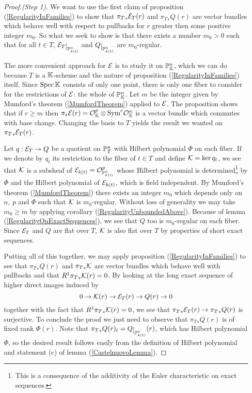 \begin{proof}[Proof.(Step 1)]
We want to use the first claim of proposition (\ref{RegularityInFamilies}) to show that ${\pi_T}_\ast\mathcal{E}_T(r)$ and ${\pi_T}_\ast Q(r)$ are vector bundles which behave well with respect to pullbacks for $r$ greater then some positive integer $m_0$. So what we seek to show is that there exists a number $m_0>0$ such that for all $t\in T$, $\Ec_T\res{\Pj^n_{k(t)}}$ and $Q\res{\Pj^n_{k(t)}}$ are $m_0$-regular. 

The more convenient approach for $\mathcal{E}$ is to study it on $\mathbb{P}^n_{\mathbb{K}}$, which we can do because $T$ is a $\mathbb{K}$-scheme and the nature of proposition (\ref{RegularityInFamilies}) itself. Since $\mathrm{Spec}\, \mathbb{K}$ consists of only one point, there is only one fiber to consider for the restrictions of $\mathcal{E}$: the whole of $\mathbb{P}^n_{\mathbb{K}}$. Let $m$ be the integer given by Mumford's theorem (\ref{MumfordTheorem}) applied to $\mathcal{E}$. The proposition shows that if $r\geq m$ then $\pi_\ast\mathcal{E}(r)=\mathcal{O}_{\mathbb{K}}^p\otimes\mathrm{Sym}^r\mathcal{O}_{\mathbb{K}}^n$ is a vector bundle which commutes with base change. Changing the basis to $T$ yields the result we wanted on ${\pi_T}_\ast\mathcal{E}_T(r)$.

Let $q:\mathcal{E}_T\twoheadrightarrow Q$ be a quotient on $\mathbb{P}^n_T$ with Hilbert polynomial $\Phi$ on each fiber. If we denote by $q_t$ its restriction to the fiber of $t\in T$ and define $\mathcal{K}=\ker q_t$, we see that $\mathcal{K}$ is a subsheaf of $\mathcal{E}_{k(t)}=\mathcal{O}_{\mathbb{P}^n_{k(t)}}^p$ whose Hilbert polynomial is determined\footnote{This is a consequence of the additivity of the Euler characteristic on exact sequences.} by $\Phi$ and the Hilbert polynomial of $\mathcal{E}_{k(t)}$, which is field independent. By Mumford's theorem (\ref{MumfordTheorem}) there exists an integer $m_0$ which depends only on $n,\ p$ and $\Phi$ such that $\mathcal{K}$ is $m_0$-regular. Without loss of generality we may take $m_0\geq m$ by applying corollary (\ref{RegularityUnboundedAbove}). Because of lemma (\ref{RegularityOnExactSequences}), we see that $Q$ too is $m_0$-regular on each fiber. Since $\mathcal{E}_T$ and $Q$ are flat over $T$, $\mathcal{K}$ is also flat over $T$ by properties of short exact sequences. 

Putting all of this together, we may apply proposition (\ref{RegularityInFamilies}) to see that ${\pi_T}_\ast Q(r)$ and ${\pi_T}_\ast\mathcal{K}$ are vector bundles which behave well with pullbacks and that $R^1{\pi_T}_\ast \mathcal{K}(r)=0$. 
By looking at the long exact sequence of higher direct images induced by
\[0\to\mathcal{K}(r)\to\mathcal{E}_T(r)\to Q(r)\to 0\]
together with the fact that $R^1{\pi_T}_\ast \mathcal{K}(r)=0$, we see that ${\pi_T}_\ast\mathcal{E}_T(r)\to{\pi_T}_\ast Q(r)$ is surjective. To conclude the proof we just need to observe that ${\pi_T}_\ast Q(r)$ is of fixed rank $\Phi(r)$. Note that ${\pi_T}_\ast Q(r)_t=Q\res{\Pj^n_{k(t)}}(r)$, which has Hilbert polynomial $\Phi$, so the desired result follows easily from the definition of Hilbert polynomial and statement (c) of lemma (\ref{CastelnuovoLemma}).
\end{proof}

